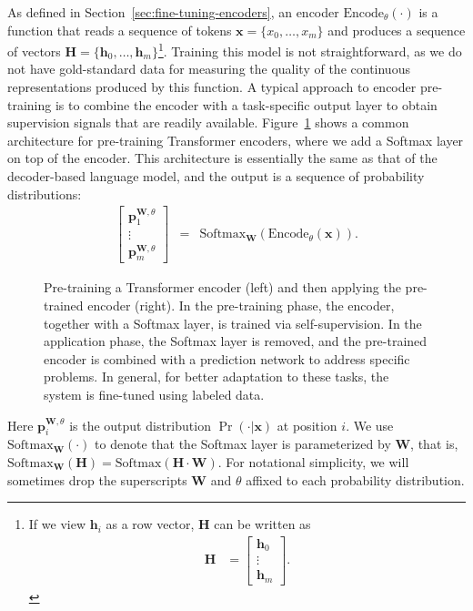 \noindent As defined in Section~\ref{sec:fine-tuning-encoders}, an encoder $\mathrm{Encode}_{\theta}(\cdot)$ is a function that reads a sequence of tokens $\mathbf{x} = \{x_0, \dots, x_m\}$ and produces a sequence of vectors $\mathbf{H} = \{\mathbf{h}_0, \dots, \mathbf{h}_m\}$\footnote{If we view $\mathbf{h}_i$ as a row vector, $\mathbf{H}$ can be written as \begin{align*}\mathbf{H} & = \begin{bmatrix} \mathbf{h}_0 \\ \vdots \\ \mathbf{h}_m \end{bmatrix}.\end{align*}}. Training this model is not straightforward, as we do not have gold-standard data for measuring the quality of the continuous representations produced by this function. A typical approach to encoder pre-training is to combine the encoder with a task-specific output layer to obtain supervision signals that are readily available. Figure~\ref{fig:pre-training-encoder-architecture} shows a common architecture for pre-training Transformer encoders, where we add a Softmax layer on top of the encoder. This architecture is essentially the same as that of the decoder-based language model, and the output is a sequence of probability distributions:
\begin{eqnarray}
\begin{bmatrix} \mathbf{p}_1^{\mathbf{W},\theta} \\ \vdots \\ \mathbf{p}_m^{\mathbf{W},\theta} \end{bmatrix} & = &  \mathrm{Softmax}_{\mathbf{W}}(\mathrm{Encode}_{\theta}(\mathbf{x})).
\end{eqnarray}

\begin{figure}[!t]
\centering

\caption{Pre-training a Transformer encoder (left) and then applying the pre-trained encoder (right). In the pre-training phase, the encoder, together with a Softmax layer, is trained via self-supervision. In the application phase, the Softmax layer is removed, and the pre-trained encoder is combined with a prediction network to address specific problems. In general, for better adaptation to these tasks, the system is fine-tuned using labeled data.}
\label{fig:pre-training-encoder-architecture}
\end{figure}

\noindent Here $\mathbf{p}_i^{\mathbf{W},\theta}$ is the output distribution $\Pr(\cdot|\mathbf{x})$ at position $i$. We use $\mathrm{Softmax}_{\mathbf{W}}(\cdot)$ to denote that the Softmax layer is parameterized by $\mathbf{W}$, that is, $\mathrm{Softmax}_{\mathbf{W}}(\mathbf{H}) = \mathrm{Softmax}(\mathbf{H} \cdot \mathbf{W})$. For notational simplicity, we will sometimes drop the superscripts $\mathbf{W}$ and $\theta$ affixed to each probability distribution.


